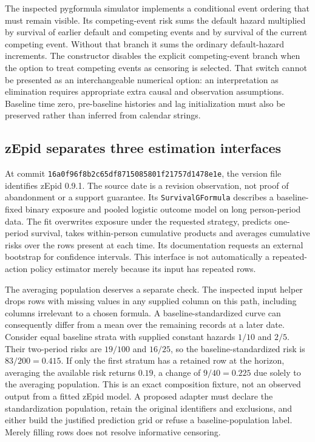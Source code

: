 The inspected pygformula simulator implements a conditional event ordering
that must remain visible. Its competing-event risk sums the default hazard
multiplied by survival of earlier default and competing events and by
survival of the current competing event. Without that branch it sums the
ordinary default-hazard increments. The constructor disables the explicit
competing-event branch when the option to treat competing events as censoring
is selected. That switch cannot be presented as an interchangeable numerical
option: an interpretation as elimination requires appropriate extra causal
and observation assumptions. Baseline time zero, pre-baseline histories and
lag initialization must also be preserved rather than inferred from calendar
strings.~\citep{exec24_longpy_pygformula_source}

\subsection{zEpid separates three estimation interfaces}
At commit \texttt{16a0f96f8b2c65df8715085801f21757d1478e1e}, the version file
identifies zEpid 0.9.1. The source date is a revision observation, not proof
of abandonment or a support guarantee. Its \texttt{SurvivalGFormula} describes
a baseline-fixed binary exposure and pooled logistic outcome model on long
person-period data. The fit overwrites exposure under the requested strategy,
predicts one-period survival, takes within-person cumulative products and
averages cumulative risks over the rows present at each time. Its documentation
requests an external bootstrap for confidence intervals. This interface is
not automatically a repeated-action policy estimator merely because its
input has repeated rows.~\citep{exec24_longpy_zepid_source}

The averaging population deserves a separate check. The inspected input
helper drops rows with missing values in any supplied column on this path,
including columns irrelevant to a chosen formula. A baseline-standardized
curve can consequently differ from a mean over the remaining records at a
later date. Consider equal baseline strata with supplied constant hazards
$1/10$ and $2/5$. Their two-period risks are $19/100$ and $16/25$, so the
baseline-standardized risk is $83/200=0.415$. If only the first stratum has
a retained row at the horizon, averaging the available risk returns $0.19$,
a change of $9/40=0.225$ due solely to the averaging population. This is an
exact composition fixture, not an observed output from a fitted zEpid model.
A proposed adapter must declare the standardization population, retain the
original identifiers and exclusions, and either build the justified prediction
grid or refuse a baseline-population label. Merely filling rows does not
resolve informative censoring.~\citep{exec24_longpy_zepid_source,exec24_longpy_reference}

